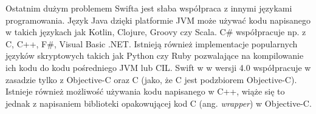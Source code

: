 \documentclass[mgr, shortabstract]{iithesis}
\newcommand{\ang}[1]{ang. \textit{#1}}
\begin{document}
Ostatnim dużym problemem Swifta jest słaba współpraca z innymi językami programowania. Język Java dzięki platformie JVM może używać kodu napisanego w takich językach jak Kotlin, Clojure, Groovy czy Scala. C\# współpracuje np. z C, C++, F\#, Visual Basic .NET. Istnieją również implementacje popularnych języków skryptowych takich jak Python czy Ruby pozwalające na kompilowanie ich kodu do kodu pośredniego JVM lub CIL. Swift w w wersji 4.0 współpracuje w zasadzie tylko z Objective-C oraz C (jako, że C jest podzbiorem Objective-C). Istnieje również możliwość używania kodu napisanego w C++, wiąże się to jednak z napisaniem biblioteki opakowującej kod C (\ang{wrapper}) w Objective-C.


\end{document}
